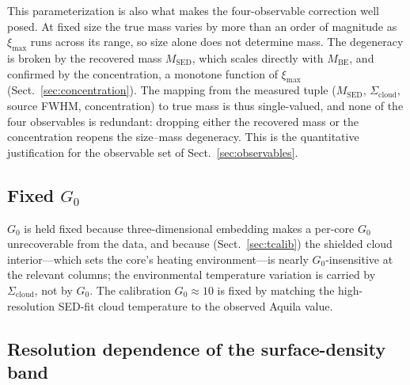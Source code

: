 \documentclass[11pt,a4paper]{article}
\newcommand{\ximax}{\xi_{\mathrm{max}}}
\newcommand{\Scloud}{\Sigma_{\mathrm{cloud}}}
\begin{document}
This parameterization is also what makes the four-observable correction well
posed. At fixed size the true mass varies by more than an order of magnitude as
$\ximax$ runs across its range, so size alone does not determine mass. The
degeneracy is broken by the recovered mass $M_{\mathrm{SED}}$, which scales
directly with $M_{\mathrm{BE}}$, and confirmed by the concentration, a monotone
function of $\ximax$ (Sect.~\ref{sec:concentration}). The mapping from the
measured tuple ($M_{\mathrm{SED}}$, $\Scloud$, source FWHM, concentration) to
true mass is thus single-valued, and none of the four observables is redundant:
dropping either the recovered mass or the concentration reopens the size--mass
degeneracy. This is the quantitative justification for the observable set of
Sect.~\ref{sec:observables}.

\subsection{Fixed $G_{0}$}
\label{sec:g0}

$G_{0}$ is held fixed because three-dimensional embedding makes a per-core
$G_{0}$ unrecoverable from the data, and because (Sect.~\ref{sec:tcalib})
the shielded cloud interior---which sets the core's heating environment---is
nearly $G_{0}$-insensitive at the relevant columns; the environmental
temperature variation is carried by $\Scloud$, not by $G_{0}$. The
calibration $G_{0}\approx 10$ is fixed by matching the high-resolution
SED-fit cloud temperature to the observed Aquila value.

\subsection{Resolution dependence of the surface-density band}
\label{sec:resolution}
\end{document}
